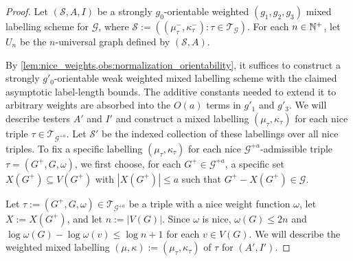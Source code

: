 \documentclass{patmorin}
\renewcommand{\le}{\leqslant}
\newcommand{\Oh}{O}
\newcommand{\calG}{\mathcal{G}}
\newcommand{\calS}{\mathcal{S}}
\newcommand{\calT}{\mathcal{T}}
\begin{document}
\begin{proof} 
  Let $(\calS,A,I)$ be a strongly $g_0$-orientable weighted $(g_1,g_2,g_3)$ mixed labelling scheme for $\calG$, where $\calS:=((\mu^-_\tau,\kappa^-_\tau):\tau\in\calT_\calG)$.  For each $n\in\mathbb{N}^+$, let $U_n$ be the $n$-universal graph defined by $(\calS,A)$.

  By \cref{lem:nice_weights,obs:normalization_orientability}, it suffices to construct a strongly $g'_0$-orientable weak weighted mixed labelling scheme with the claimed asymptotic label-length bounds. The additive constants needed to extend it to arbitrary weights are absorbed into the $\Oh(a)$ terms in $g'_1$ and $g'_3$. We will describe testers $A'$ and $I'$ and construct a mixed labelling $(\mu_\tau,\kappa_\tau)$ for each nice triple $\tau\in\calT_{\calG^{+a}}$. Let $\calS'$ be the indexed collection of these labellings over all nice triples.   To fix a specific labelling $(\mu_\tau,\kappa_\tau)$ for each nice $\calG^{+a}$-admissible triple $\tau=(G^+,G,\omega)$, we first choose, for each $G^+\in\calG^{+a}$, a specific set $X(G^+)\subseteq V(G^+)$ with $|X(G^+)|\le a$ such that $G^+-X(G^+)\in\calG$.

  Let $\tau:=(G^+,G,\omega)\in\calT_{\calG^{+a}}$ be a triple with a nice weight function $\omega$, let $X:=X(G^+)$, and let $n:=|V(G)|$. Since $\omega$ is nice, $\omega(G)\le 2n$ and $\log\omega(G)-\log\omega(v)\le\log n + 1$ for each $v\in V(G)$. We will describe the weighted mixed labelling $(\mu,\kappa):=(\mu_\tau,\kappa_\tau)$ of $\tau$ for $(A',I')$.


\end{proof}
\end{document}
